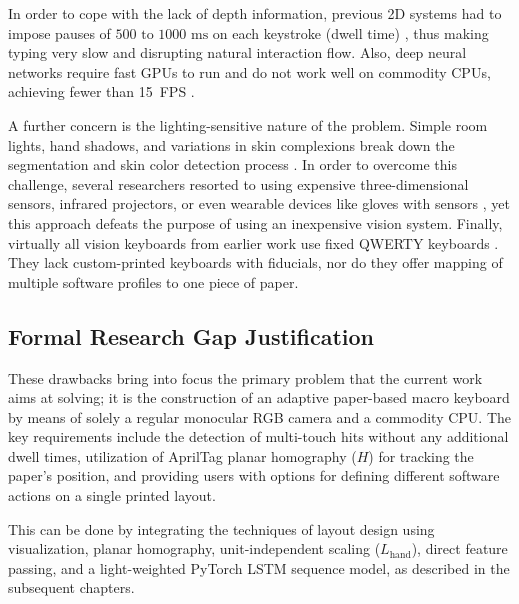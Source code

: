In order to cope with the lack of depth information, previous 2D systems had to impose pauses of $500\text{ to }1000\text{ ms}$ on each keystroke (dwell time) \cite{Khare2019QWERTY, Chen2024Gaze}, thus making typing very slow and disrupting natural interaction flow. Also, deep neural networks require fast GPUs to run and do not work well on commodity CPUs, achieving fewer than 15~FPS \cite{Enkhbat2020HandKey, Ji2018Local}.

A further concern is the lighting-sensitive nature of the problem. Simple room lights, hand shadows, and variations in skin complexions break down the segmentation and skin color detection process \cite{Thomas2013Camera, Yue2014Blind}. In order to overcome this challenge, several researchers resorted to using expensive three-dimensional sensors, infrared projectors, or even wearable devices like gloves with sensors \cite{Lee2019Virtual, Kudale2016RealTime, Toshpulatov2024RealTime, Pilkov2024Markerless}, yet this approach defeats the purpose of using an inexpensive vision system. Finally, virtually all vision keyboards from earlier work use fixed QWERTY keyboards \cite{Maman2023TypeNet, Enkhbat2020HandKey}. They lack custom-printed keyboards with fiducials, nor do they offer mapping of multiple software profiles to one piece of paper.

\subsection{Formal Research Gap Justification}
\label{subsec:lit_gap_justification}
These drawbacks bring into focus the primary problem that the current work aims at solving; it is the construction of an adaptive paper-based macro keyboard by means of solely a regular monocular RGB camera and a commodity CPU. The key requirements include the detection of multi-touch hits without any additional dwell times, utilization of AprilTag planar homography ($H$) for tracking the paper's position, and providing users with options for defining different software actions on a single printed layout.

This can be done by integrating the techniques of layout design using visualization, planar homography, unit-independent scaling ($L_{\text{hand}}$), direct feature passing, and a light-weighted PyTorch LSTM sequence model, as described in the subsequent chapters.

